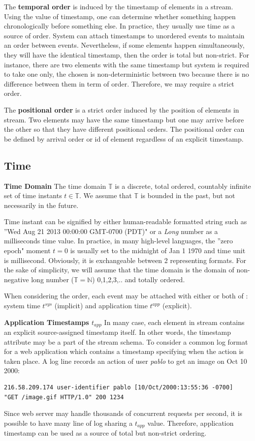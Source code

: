 The \textbf{temporal order} is induced by the timestamp of elements in a stream. Using the value of timestamp, one can determine whether something happen chronologically before something else. In practice, they usually use time as a source of order. System can attach timestamps to unordered events to maintain an order between events. Nevertheless, if some elements happen simultaneously, they will have the identical timestamp, then the order is total but non-strict. For instance, there are two elements with the same timestamp but system is required to take one only, the chosen is non-deterministic between two because there is no difference between them in term of order. Therefore, we may require a strict order.

The \textbf{positional order} is a strict order induced by the position of elements in stream. Two elements  may have the same timestamp but one may arrive before the other so that they have different positional orders. The positional order can be defined by arrival order or id of element regardless of an explicit timestamp. 



\subsection*{Time}
\textbf{Time Domain} The time domain $\mathbb{T}$ is a discrete, total ordered, countably infinite set of time instants $t \in \mathbb{T}$. We assume that $\mathbb{T}$ is bounded in the past, but not necessarily in the future.

Time instant can be signified by either human-readable formatted string  such as ''Wed Aug 21 2013 00:00:00 GMT-0700 (PDT)" or a \textit{Long} number as a milliseconds time value. In practice, in many high-level languages, the ''zero epoch" moment $t = 0$ is usually set to the midnight of Jan 1 1970 and time unit is millisecond. Obviously, it is exchangeable between 2 representing formats.   
For the sake of simplicity, we will assume that the time domain is the domain of non-negative long number ($\mathbb{T} = \mathbb{N}$) {0,1,2,3,..} and totally ordered\citep{Dindar:2013}.

When considering the order, each event may be attached with either or both of : system time $t^{sys}$ (implicit) and application time $t^{app}$ (explicit). 

\textbf{Application Timestamps $t_{app}$} In many case, each element in stream contains an explicit source-assigned timestamp itself. In other words, the timestamp attribute may be a part of the stream schema. To consider  a common log format for a web application which contains a timestamp specifying when the action is taken place. 
A log line records an action of user \textit{pablo} to get an image on Oct 10 2000:
\begin{verbatim}
216.58.209.174 user-identifier pablo [10/Oct/2000:13:55:36 -0700] 
"GET /image.gif HTTP/1.0" 200 1234
\end{verbatim}
Since web server may handle thousands of concurrent requests per second, it is possible to have many line of log sharing a $t_{app}$ value. Therefore, application timestamp can be used as a source of total but non-strict ordering.

